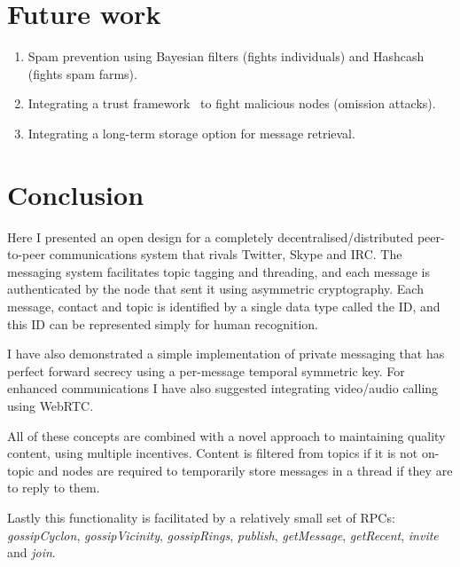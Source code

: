 \documentclass[10pt,a4paper,onecolumn]{article}
\begin{document}

\section{Future work}
\begin{enumerate}
\item Spam prevention using Bayesian filters (fights individuals) and Hashcash (fights spam farms).
\item Integrating a trust framework~\cite{ham2005ara} to fight malicious nodes (omission attacks).
\item Integrating a long-term storage option for message retrieval.
\end{enumerate}

\section{Conclusion}
Here I presented an open design for a completely decentralised/distributed peer-to-peer communications system that rivals Twitter, Skype and IRC. The messaging system facilitates topic tagging and threading, and each message is authenticated by the node that sent it using asymmetric cryptography. Each message, contact and topic is identified by a single data type called the ID, and this ID can be represented simply for human recognition. 

I have also demonstrated a simple implementation of private messaging that has perfect forward secrecy using a per-message temporal symmetric key. For enhanced communications I have also suggested integrating video/audio calling using WebRTC. 

All of these concepts are combined with a novel approach to maintaining quality content, using multiple incentives. Content is filtered from topics if it is not on-topic and nodes are required to temporarily store messages in a thread if they are to reply to them.

Lastly this functionality is facilitated by a relatively small set of RPCs: \textit{gossipCyclon}, \textit{gossipVicinity}, \textit{gossipRings}, \textit{publish}, \textit{getMessage}, \textit{getRecent}, \textit{invite} and \textit{join}. 

{}

\end{document}
